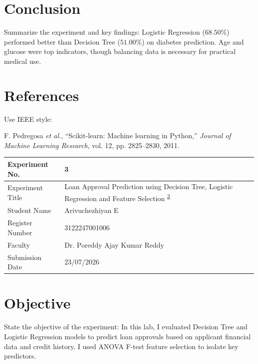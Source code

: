 \documentclass[12pt,a4paper]{article}
\begin{document}
\section{Conclusion}
Summarize the experiment and key findings:
Logistic Regression ($68.50\%$) performed better than Decision Tree ($51.00\%$) on diabetes prediction. Age and glucose were top indicators, though balancing data is necessary for practical medical use.

\section{References}
Use IEEE style:
\begin{enumerate}[label={[\arabic*]}]
\item F. Pedregosa \textit{et al.}, ``Scikit-learn: Machine learning in Python,'' \textit{Journal of Machine Learning Research}, vol. 12, pp. 2825--2830, 2011.
\end{enumerate}

\newpage


\begin{tabular}{|p{4cm}|p{11cm}|}
\hline
Experiment No. & 3 \\ \hline
Experiment Title & Loan Approval Prediction using Decision Tree, Logistic Regression and Feature Selection \textsuperscript{\href{https://github.com/arivuchezhiyan/Machine_Learning}{3}} \\ \hline
Student Name & Arivuchezhiyan E \\ \hline
Register Number & 3122247001006 \\ \hline
Faculty & Dr. Poreddy Ajay Kumar Reddy \\ \hline
Submission Date & 23/07/2026 \\ \hline
\end{tabular}

\section{Objective}
State the objective of the experiment:
In this lab, I evaluated Decision Tree and Logistic Regression models to predict loan approvals based on applicant financial data and credit history. I used ANOVA F-test feature selection to isolate key predictors.
\end{document}
